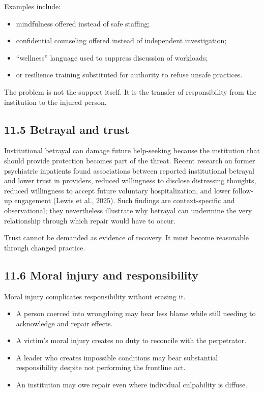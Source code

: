 \documentclass[
  11pt,
]{article}
\providecommand{\tightlist}{%
  \setlength{\itemsep}{0pt}\setlength{\parskip}{0pt}}
\begin{document}
Examples include:

\begin{itemize}
\tightlist
\item
  mindfulness offered instead of safe staffing;
\item
  confidential counseling offered instead of independent investigation;
\item
  ``wellness'' language used to suppress discussion of workloads;
\item
  or resilience training substituted for authority to refuse unsafe
  practices.
\end{itemize}

The problem is not the support itself. It is the transfer of
responsibility from the institution to the injured person.

\subsection{11.5 Betrayal and trust}\label{betrayal-and-trust}

Institutional betrayal can damage future help-seeking because the
institution that should provide protection becomes part of the threat.
Recent research on former psychiatric inpatients found associations
between reported institutional betrayal and lower trust in providers,
reduced willingness to disclose distressing thoughts, reduced
willingness to accept future voluntary hospitalization, and lower
follow-up engagement (Lewis et al., 2025). Such findings are
context-specific and observational; they nevertheless illustrate why
betrayal can undermine the very relationship through which repair would
have to occur.

Trust cannot be demanded as evidence of recovery. It must become
reasonable through changed practice.

\subsection{11.6 Moral injury and
responsibility}\label{moral-injury-and-responsibility}

Moral injury complicates responsibility without erasing it.

\begin{itemize}
\tightlist
\item
  A person coerced into wrongdoing may bear less blame while still
  needing to acknowledge and repair effects.
\item
  A victim's moral injury creates no duty to reconcile with the
  perpetrator.
\item
  A leader who creates impossible conditions may bear substantial
  responsibility despite not performing the frontline act.
\item
  An institution may owe repair even where individual culpability is
  diffuse.
\end{itemize}
\end{document}
